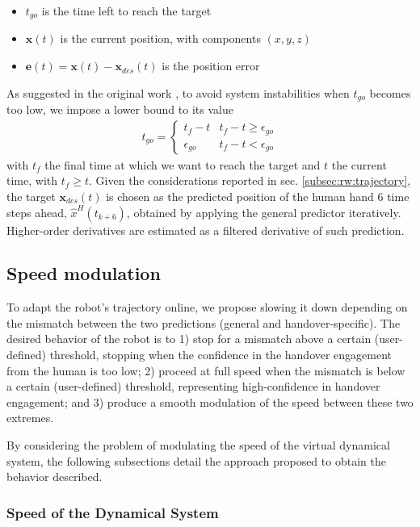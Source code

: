 \documentclass[lettersize,journal]{IEEEtran}
\newcommand{\x}{\bm x}
\newcommand{\eb}{\bm e}
\begin{document}
\begin{itemize}
    \item  $t_{go}$ is the time left to reach the target
    \item $\x(t)$ is the current position, with components $(x,y,z)$
    \item $\eb(t) = \x(t) - \x_{des}(t)$ is the position error
\end{itemize}
As suggested in the original work \cite{ghazaei_ardakani_online_2015}, to avoid system instabilities when $t_{go}$ becomes too low, we impose a lower bound to its value
\begin{align}
    t_{go} = \begin{cases}
        t_{f}-t & t_{f}-t \geq \epsilon_{go}\\
        \epsilon_{go} & t_{f}-t < \epsilon_{go}
    \end{cases}
\end{align}
with $t_f$ the final time at which we want to reach the target and $t$ the current time, with $t_f \geq t$.
Given the considerations reported in sec. \ref{subsec:rw:trajectory}, the target $\x_{des}(t)$ is chosen as the predicted position of the human hand 6 time steps ahead, $\hat{x}^H(t_{k+6})$, obtained by applying the general predictor iteratively.
Higher-order derivatives are estimated as a filtered derivative of such prediction.

\subsection{Speed modulation}

\noindent
To adapt the robot's trajectory online, we propose slowing it down depending on the mismatch between the two predictions (general and handover-specific).
The desired behavior of the robot is to 1) stop for a mismatch above a certain (user-defined) threshold, stopping when the confidence in the handover engagement from the human is too low; 2) proceed at full speed when the mismatch is below a certain (user-defined) threshold, representing high-confidence in handover engagement; and 3) produce a smooth modulation of the speed between these two extremes.

By considering the problem of modulating the speed of the virtual dynamical system, the following subsections detail the approach proposed to obtain the behavior described.

\subsubsection{Speed of the Dynamical System}
\end{document}
